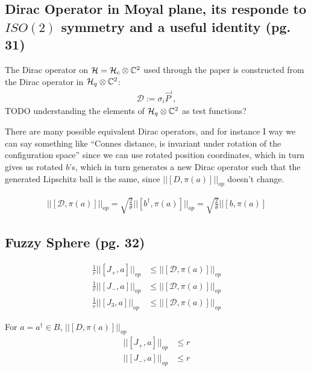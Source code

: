 \documentclass{article}
\begin{document}
\subsection{Dirac Operator in Moyal plane, its responde to $ISO(2)$ symmetry and a useful identity (pg. 31)}

The Dirac operator on $\mathcal H = \mathcal H_c \otimes \mathbb{C}^2$ used through the paper is constructed from the Dirac operator in $\mathcal H_q \otimes \mathbb{C}^2$:
\begin{align*}
    \mathcal D:= \sigma_i \hat P^i,
\end{align*}
TODO understanding the elements of $\mathcal H_q \otimes \mathbb{C}^2$ as test functions?

There are many possible equivalent Dirac operators, and for instance I way we can say something like ``Connes distance, is invariant under rotation of the configuration space'' since we can use rotated position coordinates, which in turn gives us rotated $b$'s, which in turn generates a new Dirac operator such that the generated Lipschitz ball is the same, since $||[D, \pi(a)]||_{op}$ doesn't change.

\begin{align*}
    ||[\mathcal D, \pi(a)]||_{op} = \sqrt{\frac{2}{\theta}}||[b^\dagger, \pi(a)]||_{op} = \sqrt{\frac{2}{\theta}}||[b, \pi(a)]
\end{align*}

\subsection{Fuzzy Sphere (pg. 32)}

\begin{align*}
    \frac{1}{r}||[J_+, a]||_{op} &\leq ||[\mathcal D, \pi(a)]||_{op}\\
    \frac{1}{r}||[J_-, a]||_{op} &\leq ||[\mathcal D, \pi(a)]||_{op}\\
    \frac{1}{r}||[J_3, a]||_{op} &\leq ||[\mathcal D, \pi(a)]||_{op}
\end{align*}

For $a = a^\dagger \in B$, $||[D, \pi(a)]||_{op}$
\begin{align}
    ||[J_+, a]||_{op} &\leq r\\
    ||[J_-, a]||_{op} & \leq r
\end{align}
\end{document}
